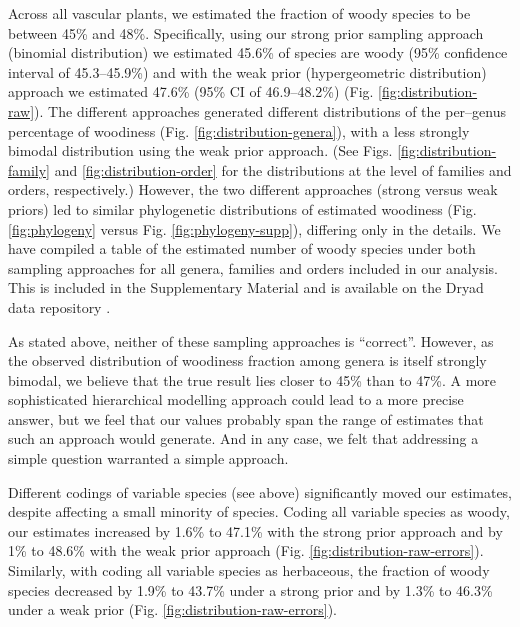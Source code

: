 \documentclass[a4paper,12pt]{article}
\begin{document}
Across all vascular plants, we estimated the fraction of woody species
to be between 45\% and 48\%.
Specifically, using our strong prior sampling approach (binomial
distribution) we estimated 45.6\% of species are woody (95\%
confidence interval of 45.3--45.9\%) and with the weak prior
(hypergeometric distribution) approach we estimated 47.6\% (95\% CI of
46.9--48.2\%) (Fig. \ref{fig:distribution-raw}).
%
The different approaches generated different distributions of the
per--genus percentage of woodiness (Fig.
\ref{fig:distribution-genera}), with a less strongly bimodal
distribution using the weak prior approach. (See Figs.
\ref{fig:distribution-family} and \ref{fig:distribution-order} 
for the distributions at the level of families and orders, respectively.) 
However, the two different approaches (strong
versus weak priors) led to similar phylogenetic distributions of
estimated woodiness (Fig. \ref{fig:phylogeny} versus Fig.
\ref{fig:phylogeny-supp}), differing only in the details. We have compiled
a table of the estimated number of woody species under both sampling
approaches for all genera, families and orders included in our analysis.
This is included in the Supplementary Material and is available on the 
Dryad data repository \citep[doi:10.5061/dryad.v7m14]{FitzJohnDryad}.

As stated above, neither of these sampling approaches is ``correct''. However,
as the observed distribution of woodiness fraction among genera is
itself strongly bimodal, we believe that the true result lies closer
to 45\% than to 47\%.  A more sophisticated hierarchical modelling
approach could lead to a more precise answer, but we feel that our
values probably span the range of estimates that such an approach
would generate. And in any case, we felt that addressing a simple question
warranted a simple approach.  

Different codings of variable species (see above) significantly moved
our estimates, despite affecting a small minority of species.  Coding
all variable species as woody, our estimates
increased by 1.6\% to 47.1\% with the strong prior approach
and by 1\% to 48.6\% with the weak prior approach (Fig.
\ref{fig:distribution-raw-errors}). Similarly, with coding
all variable species as herbaceous, the fraction of woody species
decreased by 1.9\% to 43.7\% under a strong prior
and by 1.3\% to 46.3\% under a weak prior (Fig.
\ref{fig:distribution-raw-errors}).
\end{document}
